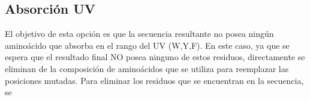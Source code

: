 \subsection{Absorción UV}

El objetivo de esta opción es que la secuencia resultante no posea ningún aminoácido que absorba en el rango del UV (W,Y,F).
En este caso, ya que se espera que el resultado final NO posea ninguno de estos residuos, directamente se eliminan de la composición de aminoácidos que se utiliza para reemplazar las posiciones mutadas. 
Para eliminar los residuos que se encuentran en la secuencia, se 
